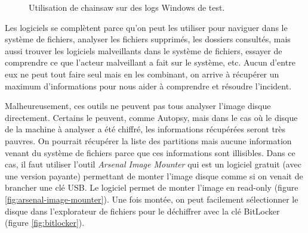 \begin{figure}
    \centering
    \caption{Utilisation de chainsaw sur des logs Windows de test.}
    \label{fig:chainsaw}
\end{figure}

Les logiciels se complètent parce qu'on peut les utiliser pour naviguer dans le système de fichiers, analyser les fichiers supprimés, les dossiers consultés, mais aussi trouver les logiciels malveillants dans le système de fichiers, essayer de comprendre ce que l'acteur malveillant a fait sur le système, etc. Aucun d'entre eux ne peut tout faire seul mais en les combinant, on arrive à récupérer un maximum d'informations pour nous aider à comprendre et résoudre l'incident.

Malheureusement, ces outils ne peuvent pas tous analyser l'image disque directement. Certains le peuvent, comme Autopsy, mais dans le cas où le disque de la machine à analyser a été chiffré, les informations récupérées seront très pauvres. On pourrait récupérer la liste des partitions mais aucune information venant du système de fichiers parce que ces informations sont illisibles. Dans ce cas, il faut utiliser l'outil \textit{Arsenal Image Mounter} qui est un logiciel gratuit (avec une version payante) permettant de monter l'image disque comme si on venait de brancher une clé USB. Le logiciel permet de monter l'image en read-only (figure \ref{fig:arsenal-image-mounter}). Une fois montée, on peut facilement sélectionner le disque dans l'explorateur de fichiers pour le déchiffrer avec la clé BitLocker (figure \ref{fig:bitlocker}).

